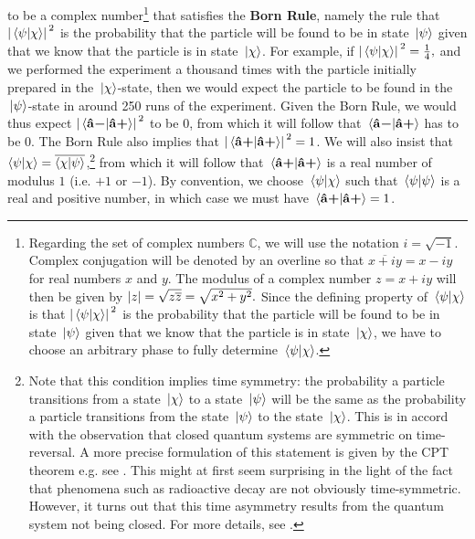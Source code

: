 to be a complex number\footnote{Regarding the set of complex numbers $\mathbb{C}$, %
%
we will use the notation $i=\sqrt{-1}$. %
%
Complex conjugation will be denoted by an overline so that $\overline{x+iy}=x-iy$ %
% 
for real numbers $x$ and $y$. The modulus of a complex number $z=x+iy$ will then be given by $\abs{z}=\sqrt{z\overline{z}}=\sqrt{x^2+y^2}.$ %
%
Since the defining property of  $\ip*{\psi}{\chi}$ is that $\abs*{\ip*{\psi}{\chi}}^2$ is the probability that the particle will be found to be in state $\ket*{\psi}$ given that we know that the particle is in state $\ket*{\chi}$, we have to choose an arbitrary phase to fully determine $\ip*{\psi}{\chi}$. } that satisfies the \textbf{Born Rule},\label{bornrule} namely the rule that $\abs*{\ip*{\psi}{\chi}}^2$ is the probability that the particle will be found to be in state $\ket*{\psi}$ given that we know that the particle is in state $\ket*{\chi}$. For example, if $\abs*{\ip*{\psi}{\chi}}^2=\frac{1}{4},$ and we performed the experiment a thousand times with the particle initially prepared in the $\ket*{\chi}$-state, then we would expect the particle to be found in the $\ket*{\psi}$-state in around 250 runs of the experiment. Given the Born Rule, we  would thus expect $\abs*{\ip*{\uvbm{a}}{\uvbp{a}}}^2$ to be $0$, from which it will follow that $\ip*{\uvbm{a}}{\uvbp{a}}$ has to be $0$. The Born Rule also implies that $\abs*{\ip*{\uvbp{a}}{\uvbp{a}}}^2=1$. We will also insist that $\ip{\psi}{\chi}=\overline{\ip{\chi}{\psi}}$,\footnote{Note that this condition implies time symmetry: the probability a particle transitions from a state $\ket*{\chi}$ to a state $\ket*{\psi}$ will be the same as the probability a particle transitions from the state $\ket*{\psi}$ to the state $\ket*{\chi}$. This is in accord with the observation that closed quantum systems are symmetric on time-reversal. A more precise formulation of this statement is given by the CPT theorem e.g. see \cite[244]{WeinbergSteven1995Tqto}. This might at first seem surprising in the light of the fact that phenomena such as radioactive decay are not obviously time-symmetric. However, it turns out that this time asymmetry results from the quantum system not being closed. For more details, see \cite{Pascazio2013}.}  from which it will follow that $\ip*{\uvbp{a}}{\uvbp{a}}$ is a real number of modulus $1$ (i.e. $+1$ or $-1$). By convention, we choose $\ip*{\psi}{\chi}$  such that $\ip*{\psi}{\psi}$ is a real and positive number, in which case we must have $\ip*{\uvbp{a}}{\uvbp{a}}=1$.
